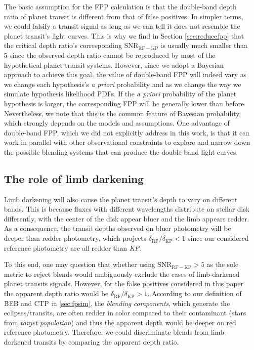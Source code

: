 \documentclass{aastex63}
\begin{document}
The basic assumption for the FPP calculation is that the double-band depth ratio of planet transit is different from that of false positives. In simpler terms, we could falsify a transit signal as long as we can tell it does not resemble the planet transit's light curves. This is why we find in Section \ref{sec:reducefpp} that the critical depth ratio's corresponding SNR$_\mathrm{RF-KP}$ is usually much smaller than 5 since the observed depth ratio cannot be reproduced by most of the hypothetical planet-transit systems. However, since we adopt a Bayesian approach to achieve this goal, the value of double-band FPP will indeed vary as we change each hypothesis's \emph{a priori} probability and as we change the way we simulate hypothesis likelihood PDFs. If the \emph{a priori} probability of the planet hypothesis is larger, the corresponding FPP will be generally lower than before. Nevertheless, we note that this is the common feature of Bayesian probability, which strongly depends on the models and assumptions. One advantage of double-band FPP, which we did not explicitly address in this work, is that it can work in parallel with other observational constraints to explore and narrow down the possible blending systems that can produce the double-band light curves.

\subsection{The role of limb darkening}

Limb darkening will also cause the planet transit's depth to vary on different bands. This is because fluxes with different wavelengths distribute on stellar disk differently, with the center of the disk appear bluer and the limb appears redder. As a consequence, the transit depths observed on bluer photometry will be deeper than redder photometry, which projects $\delta_\mathrm{RF}/\delta_\mathrm{KP}<1$ since our considered reference photometry are all redder than \emph{KP}. 

To this end, one may question that whether using SNR$_\mathrm{RF-KP}>5$ as the sole metric to reject blends would ambiguously exclude the cases of limb-darkened planet transits signals. However, for the false positives considered in this paper the apparent depth ratio would be $\delta_\mathrm{RF}/\delta_\mathrm{KP}>1$. According to our definition of BEB and CTP in \ref{sec:fpsim}, the \emph{blending components}, which generate the eclipses/transits, are often redder in color compared to their contaminant (stars from \emph{target population}) and thus the apparent depth would be deeper on red reference photometry. Therefore, we could discriminate blends from limb-darkened transits by comparing the apparent depth ratio.
\end{document}
